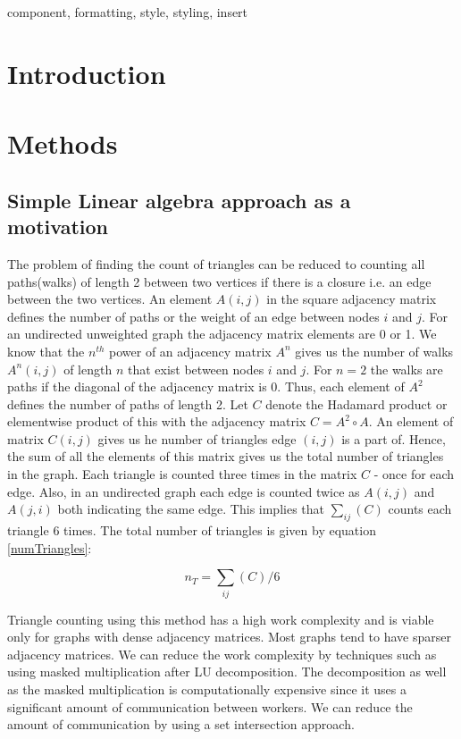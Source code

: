 \documentclass[conference]{IEEEtran}
\begin{document}
\begin{IEEEkeywords}
component, formatting, style, styling, insert
\end{IEEEkeywords}

\section{Introduction}


\section{Methods}
\subsection{Simple Linear algebra approach as a motivation}
The problem of finding the count of triangles can be reduced to counting all paths(walks) of length 2 between two vertices if there is a closure i.e. an edge between the two vertices. An element $A(i,j)$ in the square adjacency matrix defines the number of paths or the weight of an edge between nodes $i$ and $j$. For an undirected unweighted graph the adjacency matrix elements are 0 or 1. We know that the $n^{th}$ power of an adjacency matrix $A^n$ gives us the number of walks $A^n(i,j)$ of length $n$ that exist between nodes $i$ and $j$. For $n=2$ the walks are paths if the diagonal of the adjacency matrix is 0. Thus, each element of $A^2$ defines the number of paths of length 2. Let $C$ denote the Hadamard product or elementwise product of this with the adjacency matrix $C=A^2\circ A$. An element of matrix $C(i,j)$ gives us he number of triangles edge $(i,j)$ is a part of. Hence, the sum of all the elements of this matrix gives us the total number of triangles in the graph. Each triangle is counted three times in the matrix $C$ - once for each edge. Also, in an undirected graph each edge is counted twice as $A(i,j)$ and $A(j,i)$ both indicating the same edge. This implies that $\sum_{ij}(C)$ counts each triangle $6$ times. The total number of triangles is given by equation \ref{numTriangles}:

\begin{equation}
 n_{T} = \sum_{ij}(C)/6 \label{numTriangles}
\end{equation}

Triangle counting using this method has a high work complexity and is viable only for graphs with dense adjacency matrices. Most graphs tend to have sparser adjacency matrices. We can reduce the work complexity by techniques such as using masked multiplication after LU decomposition\cite{b10}. The decomposition as well as the masked multiplication is computationally expensive since it uses a significant amount of communication between workers. We can reduce the amount of communication by using a set intersection approach.
\end{document}
